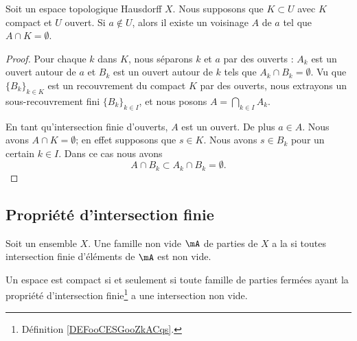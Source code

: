 \begin{lemma}			\label{LEMooNIJEooMdvkuA}
	Soit un espace topologique Hausdorff \( X\). Nous supposons que \( K\subset U\) avec \( K\) compact et \( U\) ouvert. Si \( a\not\in U\), alors il existe un voisinage \( A\) de \( a\) tel que \( A\cap K=\emptyset\).
\end{lemma}

\begin{proof}
	Pour chaque \( k\) dans \( K\), nous séparons \( k\) et \( a\) par des ouverts : \( A_k\) est un ouvert autour de \( a\) et \( B_k\) est un ouvert autour de \( k\) tels que \( A_k\cap B_k=\emptyset\). Vu que \( \{ B_k \}_{k\in K}\) est un recouvrement du compact \( K\) par des ouverts, nous extrayons un sous-recouvrement fini \( \{ B_k \}_{k\in I}\), et nous posons \( A=\bigcap_{k\in I}A_{k}\).

	En tant qu'intersection finie d'ouverts, \( A\) est un ouvert. De plus \( a\in A\). Nous avons \( A\cap K=\emptyset\); en effet supposons que \( s\in K\). Nous avons \( s\in B_k\) pour un certain \( k\in I\). Dans ce cas nous avons
	\begin{equation}
		A\cap B_k\subset A_k\cap B_k=\emptyset.
	\end{equation}
\end{proof}




\subsection{Propriété d'intersection finie}

\begin{definition}      \label{DEFooCESGooZkACqs}
	Soit un ensemble \( X\). Une famille non vide \( \mA\) de parties de \( X\) a la  si toutes intersection finie d'éléments de \( \mA\) est non vide.
\end{definition}

\begin{theorem}       \label{THOooCQSQooDuasqo}
	Un espace est compact si et seulement si toute famille de parties fermées ayant la propriété d'intersection finie\footnote{Définition \ref{DEFooCESGooZkACqs}.} a une intersection non vide.
\end{theorem}

